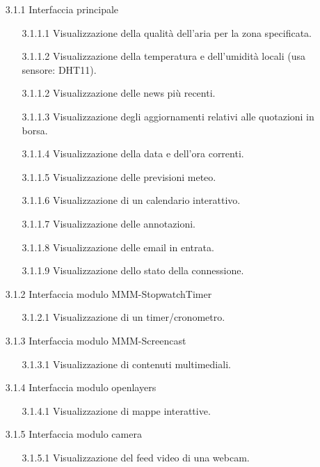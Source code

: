 \documentclass[a4paper,11pt]{article}       %
\begin{document}
        \begin{itemize}
            \item[3.1.1] Interfaccia principale
                \begin{itemize}
                    \item[3.1.1.1] Visualizzazione della qualità dell'aria per la zona specificata.
                    \item[3.1.1.2] Visualizzazione della temperatura e dell'umidità locali (usa sensore: DHT11).
                    \item[3.1.1.2] Visualizzazione delle news più recenti.
                    \item[3.1.1.3] Visualizzazione degli aggiornamenti relativi alle quotazioni in borsa.
                    \item[3.1.1.4] Visualizzazione della data e dell'ora correnti.
                    \item[3.1.1.5] Visualizzazione delle previsioni meteo.
                    \item[3.1.1.6] Visualizzazione di un calendario interattivo.
                    \item[3.1.1.7] Visualizzazione delle annotazioni.
                    \item[3.1.1.8] Visualizzazione delle email in entrata.
                    \item[3.1.1.9] Visualizzazione dello stato della connessione.
                \end{itemize}   
                
            \item[3.1.2] Interfaccia modulo MMM-StopwatchTimer
                \begin{itemize}
                    \item[3.1.2.1] Visualizzazione di un timer/cronometro.
                \end{itemize}
            \item[3.1.3] Interfaccia modulo MMM-Screencast
                \begin{itemize}
                    \item[3.1.3.1] Visualizzazione di contenuti multimediali.
                \end{itemize}
            \item[3.1.4] Interfaccia modulo openlayers
                \begin{itemize}
                    \item[3.1.4.1] Visualizzazione di mappe interattive.
                \end{itemize}
            \item[3.1.5] Interfaccia modulo camera
                \begin{itemize}
                    \item[3.1.5.1] Visualizzazione del feed video di una webcam.
                \end{itemize}
        \end{itemize}
    
\end{document}

